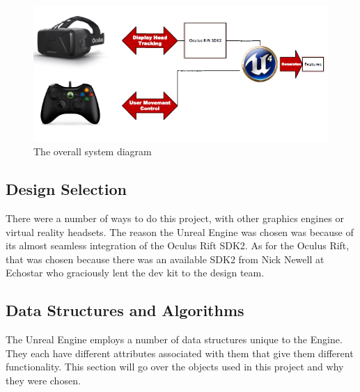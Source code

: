 \begin{figure}
 \includegraphics[scale=1.0]{Diagrams/SystemDiagram.png}
 \caption{The overall system diagram}
\end{figure}
 
 \subsection{Design Selection}
 There were a number of ways to do this project, with other graphics engines or virtual reality headsets.  The reason the Unreal Engine was chosen was because of its almost seamless integration of the Oculus Rift SDK2.  As for the Oculus Rift, that was chosen because there was an available SDK2 from Nick Newell at Echostar who graciously lent the dev kit to the design team.  
 
 \subsection{Data Structures and Algorithms}
 The Unreal Engine employs a number of data structures unique to the Engine. They each have different attributes associated with them that give them different functionality. This section will go over the objects used in this project and why they were chosen.
 
